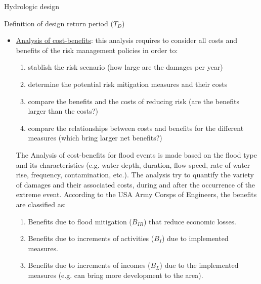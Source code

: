 \documentclass[8pt]{beamer}
\renewcommand{\emph}[1]{\textcolor{myorange}{#1}}
\begin{document}
\begin{frame}{Hydrologic design}
   \begin{block}{Definition of design return period ($T_D$)}
   \end{block}
   \begin{itemize}
       \item \emph{\underline{Analysis of cost-benefits}}: this analysis requires to consider all costs and benefits of the risk management policies in order to:
           \begin{enumerate}
               \item stablish the risk scenario (how large are the damages per year)
                \item determine the potential risk mitigation measures and their costs
                \item compare the benefits and the costs of reducing risk (are the benefits larger than the costs?)
                \item compare the relationships between costs and benefits for the different measures (which bring larger net benefits?)
           \end{enumerate}
           The \emph{Analysis of cost-benefits} for flood events is made based on the flood type and its characteristics (e.g. water depth, duration, flow speed, rate of water rise, frequency, contamination, etc.). The analysis try to quantify the variety of damages and their associated costs, during and after the occurrence of the extreme event. According to the USA Army Corsps of Engineers, the benefits are classified as:
           \begin{enumerate}
               \item Benefits due to flood mitigation ($B_{IR}$) that reduce economic losses. 
               \item Benefits due to increments  of activities ($B_I$) due to  implemented measures.
               \item Benefits due to increments of incomes ($B_L$) due to the implemented measures (e.g. can bring more development to the area).
           \end{enumerate}
   \end{itemize}
\end{frame}
\end{document}
